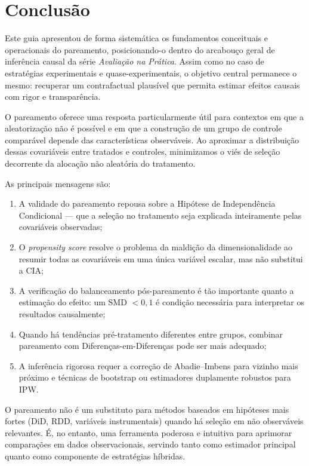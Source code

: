 \documentclass[12pt,a4paper]{article}
\begin{document}
\newpage
\section{Conclusão}\label{sec:conclusao}

Este guia apresentou de forma sistemática os fundamentos conceituais e operacionais do pareamento, posicionando-o dentro do arcabouço geral de inferência causal da série \textit{Avaliação na Prática}. Assim como no caso de estratégias experimentais e quase-experimentais, o objetivo central permanece o mesmo: recuperar um contrafactual plausível que permita estimar efeitos causais com rigor e transparência.

O pareamento oferece uma resposta particularmente útil para contextos em que a aleatorização não é possível e em que a construção de um grupo de controle comparável depende das características observáveis. Ao aproximar a distribuição dessas covariáveis entre tratados e controles, minimizamos o viés de seleção decorrente da alocação não aleatória do tratamento.

As principais mensagens são:

\begin{enumerate}[leftmargin=1.5cm]
  \item A validade do pareamento repousa sobre a Hipótese de Independência Condicional --- que a seleção no tratamento seja explicada inteiramente pelas covariáveis observadas;
  \item O \textit{propensity score} resolve o problema da maldição da dimensionalidade ao resumir todas as covariáveis em uma única variável escalar, mas não substitui a CIA;
  \item A verificação do balanceamento pós-pareamento é tão importante quanto a estimação do efeito: um SMD $< 0{,}1$ é condição necessária para interpretar os resultados causalmente;
  \item Quando há tendências pré-tratamento diferentes entre grupos, combinar pareamento com Diferenças-em-Diferenças pode ser mais adequado;
  \item A inferência rigorosa requer a correção de Abadie--Imbens para vizinho mais próximo e técnicas de bootstrap ou estimadores duplamente robustos para IPW.
\end{enumerate}

O pareamento não é um substituto para métodos baseados em hipóteses mais fortes (DiD, RDD, variáveis instrumentais) quando há seleção em não observáveis relevantes. É, no entanto, uma ferramenta poderosa e intuitiva para aprimorar comparações em dados observacionais, servindo tanto como estimador principal quanto como componente de estratégias híbridas.
\end{document}
